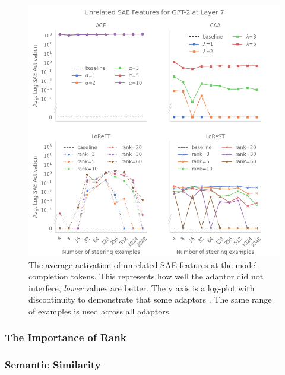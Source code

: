 \begin{figure}
    \centering
    \captionsetup{width=\textwidth}
    \includegraphics[width=\textwidth]{figures/gpt2_7_unrelated.png}
    \caption{
        The average activation of unrelated SAE features at the model completion tokens.
        This represents how well the adaptor did not interfere, \emph{lower} values are better.
        The y axis is a log-plot with discontinuity to demonstrate that some adaptors .
        The same range of examples is used across all adaptors.
    }
    \label{fig:gpt-pp-unrelated}
\end{figure}

\subsubsection{The Importance of Rank}
\label{sec:rank-res}

\subsubsection{Semantic Similarity}

